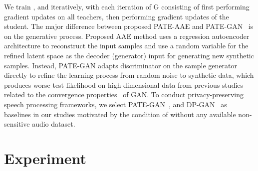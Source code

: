 \documentclass[a4paper]{article}
\begin{document}
We train ,  and  iteratively, with each iteration of G consisting of first performing gradient updates on all teachers, then performing gradient updates of the student. The major difference between proposed PATE-AAE and PATE-GAN~\cite{jordon2019pate} is on the generative process. Proposed AAE method uses a regression autoencoder architecture to reconstruct the input samples and use a random variable for the refined latent space as the decoder (generator) input for generating new synthetic samples. Instead, PATE-GAN adapts discriminator on the sample generator directly to refine the learning process from random noise to synthetic data, which produces worse test-likelihood on high dimensional data from previous studies~\cite{chen2020gs, chen2020gan} related to the convergence properties~\cite{kodali2017convergence} of GAN. To conduct privacy-preserving speech processing frameworks, we select PATE-GAN~\cite{jordon2019pate}, and DP-GAN~\cite{xie2018differentially} as baselines in our studies motivated by the condition of without any available non-sensitive audio dataset.







\section{Experiment}
\end{document}
